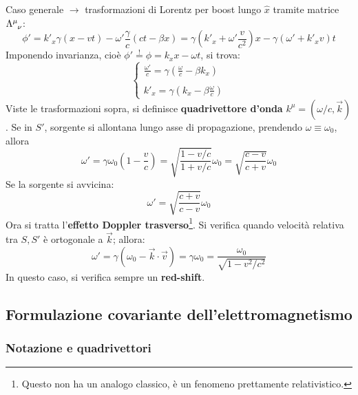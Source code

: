 \documentclass[10pt, a4paper]{scrartcl}
\numberwithin{equation}{subsection}
\theoremstyle{style1}
\begin{document}
Caso generale $\to$ trasformazioni di Lorentz per boost lungo $\hat{x}$ tramite matrice $\Lambda\indices{^\mu _\nu}$:
\[
\phi ' = k'_x \gamma(x-vt) - \omega' \frac{\gamma}{c}(ct - \beta x) = \gamma \left(k'_x + \omega' \frac{v}{c^2}\right) x - \gamma\left(\omega' + k'_x v  \right)t 
\] 
Imponendo invarianza, cio\`e $\phi '\stackrel{!}{=} \phi =k_x x - \omega t$, si trova:
\begin{equation}
	\begin{cases}
		\displaystyle \frac{\omega'}{c}= \gamma\left(\frac{\omega}{c}-\beta k_x\right) \\
		\\
		\displaystyle k'_x = \gamma\left(k_x- \beta  \frac{\omega}{c}\right) 
	\end{cases}
\end{equation}
Viste le trasformazioni sopra, si definisce \textbf{quadrivettore d'onda} $k^\mu  = (\omega / c, \vec{k})$. Se in $S'$, sorgente si allontana lungo asse di propagazione, prendendo $\omega\equiv \omega_0$, allora
\begin{equation}
	\omega' = \gamma\omega_0 \left(1- \frac{v}{c}\right) = \sqrt{\frac{1- v/c}{1+v / c}} \omega_0 = \sqrt{\frac{c-v}{c+v}} \omega_0
\end{equation}
Se la sorgente si avvicina:
\begin{equation}
	\omega' = \sqrt{\frac{c+v}{c-v}} \omega_0
\end{equation}
Ora si tratta l'\textbf{effetto Doppler trasverso}\footnote{Questo non ha un analogo classico, \`e un fenomeno prettamente relativistico.}. Si verifica quando velocit\`a relativa tra $S,S'$ \`e ortogonale a $\vec{k}$; allora:
\begin{equation}
	\omega'= \gamma(\omega_0-\vec{k}\cdot \vec{v}) = \gamma\omega_0 = \frac{\omega_0}{\sqrt{1- v^2 / c^2} }
\end{equation}
In questo caso, si verifica sempre un \textbf{red-shift}. 
\subsection{Formulazione covariante dell'elettromagnetismo}
\subsubsection{Notazione e quadrivettori}
\end{document}
